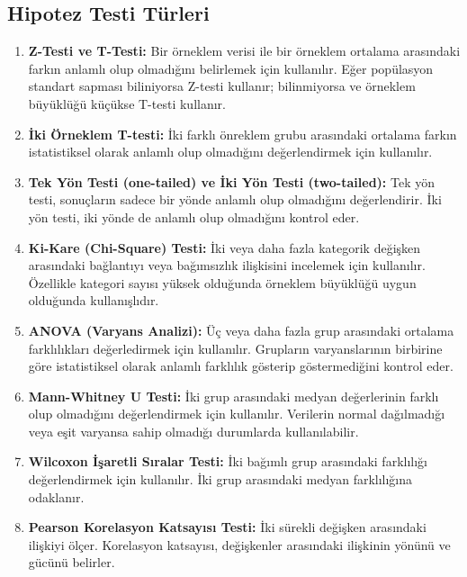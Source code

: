 \subsection{Hipotez Testi Türleri}
\begin{enumerate}
    \item \textbf{Z-Testi ve T-Testi:} Bir örneklem verisi ile bir örneklem ortalama arasındaki farkın anlamlı olup olmadığını belirlemek için kullanılır. Eğer popülasyon standart sapması biliniyorsa Z-testi kullanır; bilinmiyorsa ve örneklem büyüklüğü küçükse T-testi kullanır.
    \item \textbf{İki Örneklem T-testi:} İki farklı önreklem grubu arasındaki ortalama farkın istatistiksel olarak anlamlı olup olmadığını değerlendirmek için kullanılır.
    \item \textbf{Tek Yön Testi (one-tailed) ve İki Yön Testi (two-tailed):} Tek yön testi, sonuçların sadece bir yönde anlamlı olup olmadığını değerlendirir. İki yön testi, iki yönde de anlamlı olup olmadığını kontrol eder.
    \item \textbf{Ki-Kare (Chi-Square) Testi:} İki veya daha fazla kategorik değişken arasındaki bağlantıyı veya bağımsızlık ilişkisini incelemek için kullanılır. Özellikle kategori sayısı yüksek olduğunda örneklem büyüklüğü uygun olduğunda kullanışlıdır.
    \item \textbf{ANOVA (Varyans Analizi):} Üç veya daha fazla grup arasındaki ortalama farklılıkları değerledirmek için kullanılır. Grupların varyanslarının birbirine göre istatistiksel olarak anlamlı farklılık gösterip göstermediğini kontrol eder.
    \item \textbf{Mann-Whitney U Testi:} İki grup arasındaki medyan değerlerinin farklı olup olmadığını değerlendirmek için kullanılır. Verilerin normal dağılmadığı veya eşit varyansa sahip olmadığı durumlarda kullanılabilir.
    \item \textbf{Wilcoxon İşaretli Sıralar Testi:} İki bağımlı grup arasındaki farklılığı değerlendirmek için kullanılır. İki grup arasındaki medyan farklılığına odaklanır.
    \item \textbf{Pearson Korelasyon Katsayısı Testi:} İki sürekli değişken arasındaki ilişkiyi ölçer. Korelasyon katsayısı, değişkenler arasındaki ilişkinin yönünü ve gücünü belirler.
\end{enumerate}

\newpage

